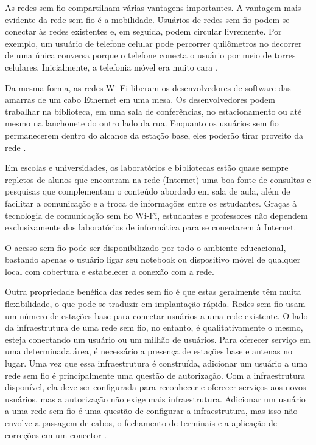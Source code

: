 As redes sem fio compartilham várias vantagens importantes. A vantagem mais evidente da rede sem fio é a mobilidade. Usuários de redes sem fio podem se conectar às redes existentes e, em seguida, podem circular livremente. Por exemplo, um usuário de telefone celular pode percorrer quilômetros no decorrer de uma única conversa porque o telefone conecta o usuário por meio de torres celulares. Inicialmente, a telefonia móvel era muito cara \cite{gast2002}.

Da mesma forma, as redes Wi-Fi liberam os desenvolvedores de software das amarras de um cabo Ethernet em uma mesa. Os desenvolvedores podem trabalhar na biblioteca, em uma sala de conferências, no estacionamento ou até mesmo na lanchonete do outro lado da rua. Enquanto os usuários sem fio permanecerem dentro do alcance da estação base, eles poderão tirar proveito da rede \cite{gast2002}.

Em escolas e universidades, os laboratórios e bibliotecas estão quase sempre repletos de alunos que encontram na rede (Internet) uma boa fonte de consultas e pesquisas que complementam o conteúdo abordado em sala de aula, além de facilitar a comunicação e a troca de informações entre os estudantes. Graças à tecnologia de comunicação sem fio Wi-Fi, estudantes e professores não dependem exclusivamente dos laboratórios de informática para se conectarem à Internet.

O acesso sem fio pode ser disponibilizado por todo o ambiente educacional, bastando apenas o usuário ligar seu notebook ou dispositivo móvel de qualquer local com cobertura e estabelecer a conexão com a rede.

Outra propriedade benéfica das redes sem fio é que estas geralmente têm muita flexibilidade, o que pode se traduzir em implantação rápida. Redes sem fio usam um número de estações base para conectar usuários a uma rede existente. O lado da infraestrutura de uma rede sem fio, no entanto, é qualitativamente o mesmo, esteja conectando um usuário ou um milhão de usuários. Para oferecer serviço em uma determinada área, é necessário a presença de estações base e antenas no lugar.
Uma vez que essa infraestrutura é construída, adicionar um usuário a uma rede sem fio é principalmente uma questão de autorização. Com a infraestrutura disponível, ela deve ser configurada para reconhecer e oferecer serviços aos novos usuários, mas a autorização não exige mais infraestrutura. Adicionar um usuário a uma rede sem fio é uma questão de configurar a infraestrutura, mas isso não envolve a passagem de cabos, o fechamento de terminais e a aplicação de correções em um conector \cite{gast2002}.

